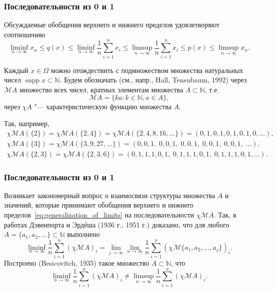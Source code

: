 \documentclass[10pt,pdf,hyperref={unicode},aspectratio=169,color={usenames, dvipsnames}]{beamer}\usepackage{amsmath}
\theoremstyle{definition}
\begin{document}
\begin{frame}
	\frametitle{Последовательности из 0 и 1}

	Обсуждаемые обобщения верхнего и нижнего пределов удовлетворяют соотношению
	\begin{equation}
		\label{eq:generalization_of_limits}
		\liminf_{n\to\infty} x_n \leq q(x) \leq \liminf_{n\to\infty}\frac1{n}\sum_{i=1}^n x_i
		\leq
		\limsup_{n\to\infty}\frac1{n}\sum_{i=1}^n x_i
		\leq p(x)
		\leq \limsup_{n\to\infty} x_n
		.
	\end{equation}


	Каждый $x\in \Omega$ можно отождествить с подмножеством множества натуральных чисел
	$\operatorname{supp} x \subset \mathbb{N}$.
	Будем обозначать (см., напр., Hall, Tenenbaum, 1992) через $\mathscr{M}A$ множество всех чисел,
	кратных элементам множества $A\subset\mathbb{N}$, т.е.
	\begin{equation}
		\mathscr{M}A = \{ka: k\in\mathbb{N}, a\in A\}
		,
	\end{equation}
	через $\chi A$ "--- характеристическую функцию множества $A$.

	Так, например,
	\begin{gather}
		\chi \mathscr{M}\!A(\{2\}) = \chi \mathscr{M}\!A(\{2, 4\}) = \chi \mathscr{M}\!A(\{2,4,8,16,...\})
		= (0,1,0,1,0,1,0,1,0,...),
	\\
		\chi \mathscr{M}\!A(\{3\}) = \chi \mathscr{M}\!A(\{3,9,27,...\}) = (0,0,1,\;0,0,1,\;0,0,1,\;0,0,1,\;0,0,1,\;...),
	\\
		\chi \mathscr{M}\!A(\{2,3\}) = \chi \mathscr{M}\!A(\{2,3,6\}) = (0,1,1,1,0,1,\;0,1,1,1,0,1,\;0,1,1,1,0,1,...).
	\end{gather}
\end{frame}

\begin{frame}
	\frametitle{Последовательности из 0 и 1}


	Возникает закономерный вопрос о взаимосвязи структуры множества $A$
	и значений, которые принимают обобщения верхнего и нижнего пределов~\eqref{eq:generalization_of_limits}
	на последовательности $\chi \mathscr{M}\!A$.
	Так, в работах Дэвенпорта и Эрдёша (1936 г., 1951 г.) доказано, что для любого
	$A=\{a_1,a_2,...\}\subset\mathbb{N}$
	выполнено
	\begin{equation}
		\liminf_{n\to\infty}\frac1{n}\sum_{i=1}^n (\chi\mathscr{M}A)_i =
		\lim_{j\to\infty}\lim_{n\to\infty}\frac1{n}\sum_{i=1}^n (\chi\mathscr{M}\{a_1,a_2,...,a_j\})_i
		.
	\end{equation}
	Построено (Besicovitch, 1935) такое множество $A\subset\mathbb{N}$, что
	\begin{equation}
		\liminf_{n\to\infty}\frac1{n}\sum_{i=1}^n (\chi\mathscr{M}A)_i \neq
		\limsup_{n\to\infty}\frac1{n}\sum_{i=1}^n (\chi\mathscr{M}A)_i
		.
	\end{equation}

\end{frame}
\end{document}
